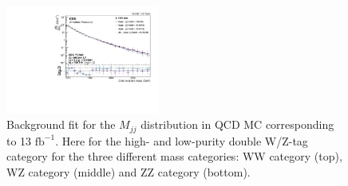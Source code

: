 \begin{figure}[h!]
\includegraphics[width=0.45\textwidth]{figures/analysis/search2/AN-16-235/plots/ZZLP_fitComp.pdf}
\caption{Background fit for the $M_{jj}$ distribution in QCD MC corresponding to 13 $\textrm{fb}^{-1}$. Here for the high- and low-purity double W/Z-tag category for the three different mass categories: WW category (top), WZ category (middle) and ZZ category (bottom).}
\label{fig:bkgfitQCD_VV}
\end{figure}

